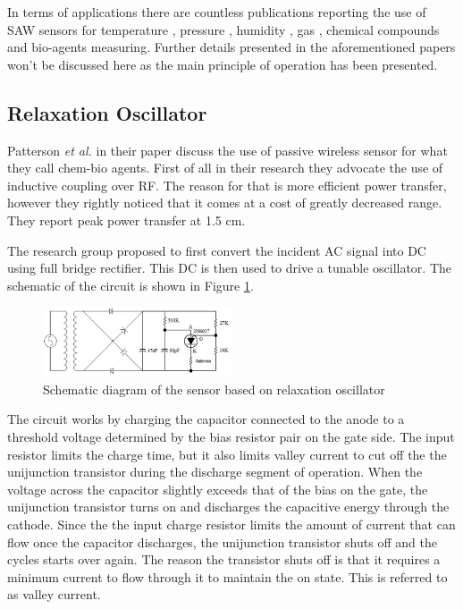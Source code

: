 \documentclass[11pt,a4paper]{article}
\begin{document}
In terms of applications there are countless publications reporting the use of SAW sensors for temperature \cite{sawtemp1, sawtemp2}, pressure \cite{sawtemp2, sawpres1, sawpres2, sawpres3}, humidity \cite{sawhum}, gas \cite{sawgas}, chemical compounds \cite{sawchem1, sawchem2} and bio-agents \cite{sawbio1, sawbio2} measuring. Further details presented in the aforementioned papers won't be discussed here as the main principle of operation has been presented.


\subsection{Relaxation Oscillator}

Patterson \textit{et al.} in their paper \cite{relax} discuss the use of passive wireless sensor for what they call chem-bio agents. First of all in their research they advocate the use of inductive coupling over RF. The reason for that is more efficient power transfer, however they rightly noticed that it comes at a cost of greatly decreased range. They report peak power transfer at 1.5 cm.

The research group proposed to first convert the incident AC signal into DC using full bridge rectifier. This DC is then used to drive a tunable oscillator. The schematic of the circuit is shown in Figure \ref{fig:circuit}.

\begin{figure}[h]
\centering
\includegraphics[width=0.5\textwidth]{relax.JPG}
\caption{Schematic diagram of the sensor based on relaxation oscillator \cite{relax}\label{fig:circuit}}
\end{figure}

The circuit works by charging the capacitor connected to the anode to a threshold voltage determined by the bias resistor pair on the gate side. The input resistor limits the charge time, but it also limits valley current to cut off the the unijunction transistor during the discharge segment of operation. When the voltage across the capacitor slightly exceeds that of the bias on the gate, the unijunction transistor turns on and discharges the capacitive energy through the cathode. Since the the input charge resistor limits the amount of current that can flow once the capacitor discharges, the unijunction transistor shuts off and the cycles starts over again. The reason the transistor shuts off is that it requires a minimum current to flow through it to maintain the on state. This is referred to as valley current.
\end{document}
